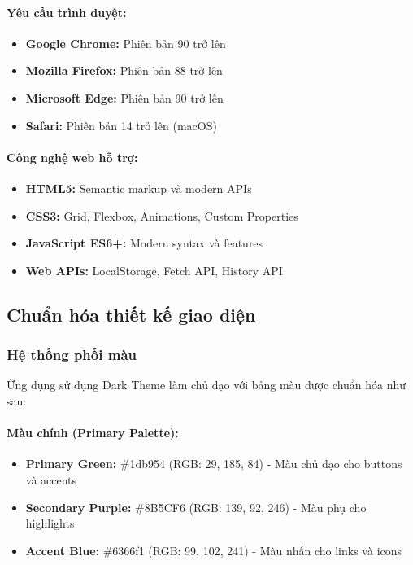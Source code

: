 \paragraph{Yêu cầu trình duyệt:}
\begin{itemize}
    \item \textbf{Google Chrome:} Phiên bản 90 trở lên
    \item \textbf{Mozilla Firefox:} Phiên bản 88 trở lên
    \item \textbf{Microsoft Edge:} Phiên bản 90 trở lên
    \item \textbf{Safari:} Phiên bản 14 trở lên (macOS)
\end{itemize}

\paragraph{Công nghệ web hỗ trợ:}
\begin{itemize}
    \item \textbf{HTML5:} Semantic markup và modern APIs
    \item \textbf{CSS3:} Grid, Flexbox, Animations, Custom Properties
    \item \textbf{JavaScript ES6+:} Modern syntax và features
    \item \textbf{Web APIs:} LocalStorage, Fetch API, History API
\end{itemize}

\subsection{Chuẩn hóa thiết kế giao diện}

\subsubsection{Hệ thống phối màu}

Ứng dụng sử dụng Dark Theme làm chủ đạo với bảng màu được chuẩn hóa như sau:

\paragraph{Màu chính (Primary Palette):}
\begin{itemize}
    \item \textbf{Primary Green:} \#1db954 (RGB: 29, 185, 84) - Màu chủ đạo cho buttons và accents
    \item \textbf{Secondary Purple:} \#8B5CF6 (RGB: 139, 92, 246) - Màu phụ cho highlights
    \item \textbf{Accent Blue:} \#6366f1 (RGB: 99, 102, 241) - Màu nhấn cho links và icons
\end{itemize}

